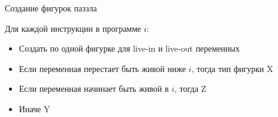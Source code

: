 \documentclass[aspectratio=169
  , xcolor={svgnames}
  , hyperref={ colorlinks,citecolor=DeepPink4
             , linkcolor=DarkRed,urlcolor=DarkBlue}
  , russian
  ]{beamer}
\theoremstyle{exerciseStyle1}
\begin{document}
\begin{frame}[fragile]{Создание фигурок паззла}
\begin{minipage}{.33\textwidth}
Для каждой инструкции в программе $i$:
\begin{itemize} 
\item Создать по одной фигурке для live-in и live-out переменных
\item Если переменная перестает быть живой ниже $i$, тогда тип фигурки  X
\item Если переменная начинает быть живой в $i$, тогда Z
\item Иначе Y
\end{itemize}
\end{minipage}
\end{frame}
\end{document}
